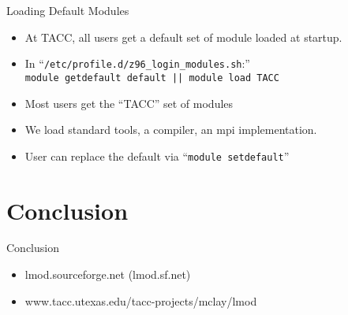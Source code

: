 \documentclass{beamer}
\begin{document}
\begin{frame}{Loading Default Modules}
  \begin{itemize}
    \item At TACC, all users get a default set of module loaded at startup.
    \item In ``\texttt{/etc/profile.d/z96\_login\_modules.sh}:'' \\
      {\color{blue}\texttt{module getdefault default || module load TACC}}
    \item Most users get the ``TACC'' set of modules
    \item We load standard tools, a compiler, an mpi implementation.
    \item User can replace the default via ``{\color{blue}\texttt{module setdefault}}''
  \end{itemize}
\end{frame}




\section{Conclusion}

\begin{frame}{Conclusion}
  \begin{itemize}
    \item lmod.sourceforge.net (lmod.sf.net)
    \item www.tacc.utexas.edu/tacc-projects/mclay/lmod
  \end{itemize}
\end{frame}
\end{document}
